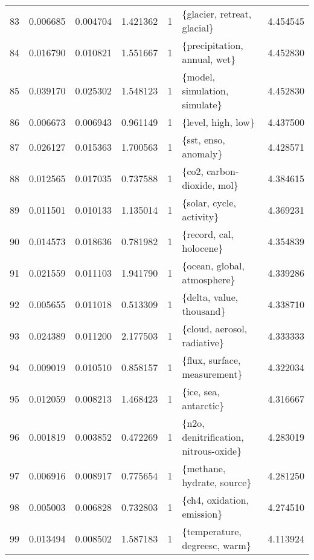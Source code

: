 \begin{tabular}{lrrrrlr}
83 &    0.006685 &  0.004704 &        1.421362 &           1 &             \{glacier, retreat, glacial\} &  4.454545 \\
84 &    0.016790 &  0.010821 &        1.551667 &           1 &            \{precipitation, annual, wet\} &  4.452830 \\
85 &    0.039170 &  0.025302 &        1.548123 &           1 &           \{model, simulation, simulate\} &  4.452830 \\
86 &    0.006673 &  0.006943 &        0.961149 &           1 &                      \{level, high, low\} &  4.437500 \\
87 &    0.026127 &  0.015363 &        1.700563 &           1 &                    \{sst, enso, anomaly\} &  4.428571 \\
88 &    0.012565 &  0.017035 &        0.737588 &           1 &              \{co2, carbon-dioxide, mol\} &  4.384615 \\
89 &    0.011501 &  0.010133 &        1.135014 &           1 &                \{solar, cycle, activity\} &  4.369231 \\
90 &    0.014573 &  0.018636 &        0.781982 &           1 &                 \{record, cal, holocene\} &  4.354839 \\
91 &    0.021559 &  0.011103 &        1.941790 &           1 &             \{ocean, global, atmosphere\} &  4.339286 \\
92 &    0.005655 &  0.011018 &        0.513309 &           1 &                \{delta, value, thousand\} &  4.338710 \\
93 &    0.024389 &  0.011200 &        2.177503 &           1 &             \{cloud, aerosol, radiative\} &  4.333333 \\
94 &    0.009019 &  0.010510 &        0.858157 &           1 &            \{flux, surface, measurement\} &  4.322034 \\
95 &    0.012059 &  0.008213 &        1.468423 &           1 &                   \{ice, sea, antarctic\} &  4.316667 \\
96 &    0.001819 &  0.003852 &        0.472269 &           1 &   \{n2o, denitrification, nitrous-oxide\} &  4.283019 \\
97 &    0.006916 &  0.008917 &        0.775654 &           1 &              \{methane, hydrate, source\} &  4.281250 \\
98 &    0.005003 &  0.006828 &        0.732803 &           1 &              \{ch4, oxidation, emission\} &  4.274510 \\
99 &    0.013494 &  0.008502 &        1.587183 &           1 &           \{temperature, degreesc, warm\} &  4.113924 \\
\bottomrule
\end{tabular}
